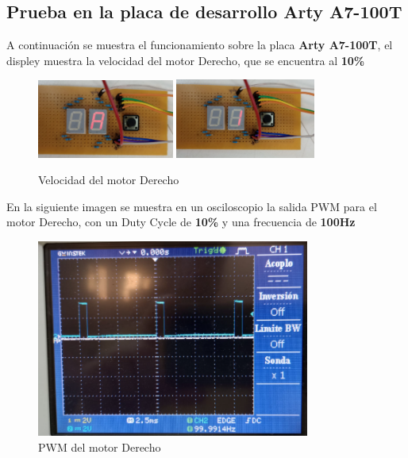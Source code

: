 \documentclass[12pt]{article}
\begin{document}
\subsection{Prueba en la placa de desarrollo \textbf{Arty A7-100T}}

A continuación se muestra el funcionamiento sobre la placa \textbf{Arty A7-100T}, el displey muestra la velocidad del motor Derecho, que se encuentra al \textbf{10\%}

\begin{figure}[H]
    \centering
    \includegraphics[width=0.4\textwidth]{display-motor-derecho-1}
    \includegraphics[width=0.41\textwidth]{display-motor-derecho-2}
    \caption{Velocidad del motor Derecho}
\end{figure}

En la siguiente imagen se muestra en un osciloscopio la salida PWM para el motor Derecho, con un Duty Cycle de \textbf{10\%} y una frecuencia de \textbf{100Hz}

\begin{figure}[H]
    \centering
    \includegraphics[width=0.8\textwidth]{pwm-motor-derecho-1}
    \caption{PWM del motor Derecho}
\end{figure}
\end{document}
